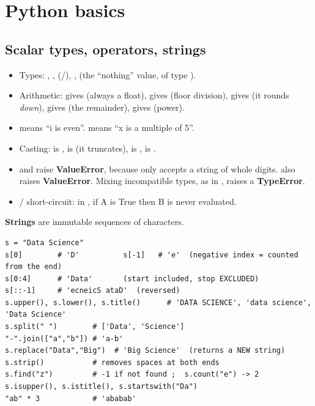 \newpage
\section{Python basics}

\subsection{Scalar types, operators, strings}
\begin{itemize}
  \item Types: , ,  (/), ,  (the ``nothing'' value, of type ).
  \item Arithmetic:  gives  (always a float),  gives  (floor division),  gives  (it rounds \emph{down}),  gives  (the remainder),  gives  (power).
  \item {} means ``i is even''.  means ``x is a multiple of 5''.
  \item Casting:  is ,  is  (it truncates),  is ,  is \code{\textquotesingle{}5\textquotesingle{}}.
  \item {} and  raise \textbf{ValueError}, because  only accepts a string of whole digits.  also raises \textbf{ValueError}. Mixing incompatible types, as in , raises a \textbf{TypeError}.
  \item {}/ short-circuit: in , if A is True then B is never evaluated.
\end{itemize}

\textbf{Strings} are immutable sequences of characters.
\begin{codebox}
\begin{Verbatim}
s = "Data Science"
s[0]        # 'D'          s[-1]   # 'e'  (negative index = counted from the end)
s[0:4]      # 'Data'       (start included, stop EXCLUDED)
s[::-1]     # 'ecneicS ataD'  (reversed)
s.upper(), s.lower(), s.title()      # 'DATA SCIENCE', 'data science', 'Data Science'
s.split(" ")        # ['Data', 'Science']
"-".join(["a","b"]) # 'a-b'
s.replace("Data","Big")  # 'Big Science'  (returns a NEW string)
s.strip()           # removes spaces at both ends
s.find("z")         # -1 if not found ;  s.count("e") -> 2
s.isupper(), s.istitle(), s.startswith("Da")
"ab" * 3            # 'ababab'
\end{Verbatim}
\end{codebox}

